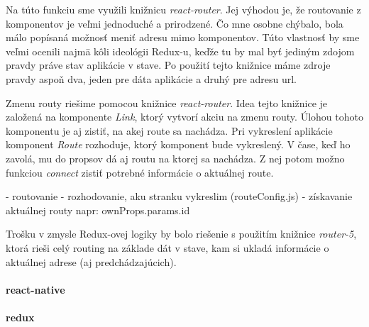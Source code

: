 Na túto funkciu sme využili knižnicu \emph{react-router}. Jej výhodou je, že routovanie z komponentov je veľmi jednoduché a prirodzené. Čo mne osobne chýbalo, bola málo popísaná možnosť meniť adresu mimo komponentov. Túto vlastnosť by sme veľmi ocenili najmä kôli ideológii Redux-u, keďže tu by mal byť jediným zdojom pravdy práve stav aplikácie v stave. Po použití tejto knižnice máme zdroje pravdy aspoň dva, jeden pre dáta aplikácie a druhý pre adresu url. %

\TODO{} Zmenu routy riešime pomocou knižnice \emph{react-router}. %
Idea tejto knižnice je založená na komponente \emph{Link}, ktorý vytvorí akciu na zmenu routy. Úlohou tohoto komponentu je aj zistiť, na akej route sa nachádza. 
Pri vykreslení aplikácie komponent \emph{Route} rozhoduje, ktorý komponent bude vykreslený. V čase, keď ho zavolá, mu do propsov dá aj routu na ktorej sa nachádza. Z nej potom možno funkciou \emph{connect} zistiť potrebné informácie o aktuálnej route. %

\TODO{}
- routovanie
  - rozhodovanie, aku stranku vykreslim (routeConfig.js)
  - získavanie aktuálnej routy %
  napr: ownProps.params.id


Trošku  v zmysle Redux-ovej logiky by bolo riešenie s použitím knižnice \emph{router-5}, ktorá rieši celý routing na základe dát v stave, kam si ukladá informácie o aktuálnej adrese (aj predchádzajúcich).

\cite[Redux]{Redux}

\paragraph{react-native}
\TODO{}

\paragraph{redux}
\TODO{}

